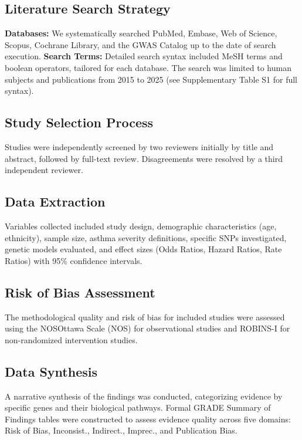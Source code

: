 \documentclass[11pt,a4paper]{article}
\begin{document}
\subsection{Literature Search Strategy}
\textbf{Databases:} We systematically searched PubMed, Embase, Web of Science, Scopus, Cochrane Library, and the GWAS Catalog up to the date of search execution.
\textbf{Search Terms:} Detailed search syntax included MeSH terms and boolean operators, tailored for each database. The search was limited to human subjects and publications from 2015 to 2025 (see Supplementary Table S1 for full syntax).

\subsection{Study Selection Process}
Studies were independently screened by two reviewers initially by title and abstract, followed by full-text review. Disagreements were resolved by a third independent reviewer.

\subsection{Data Extraction}
Variables collected included study design, demographic characteristics (age, ethnicity), sample size, asthma severity definitions, specific SNPs investigated, genetic models evaluated, and effect sizes (Odds Ratios, Hazard Ratios, Rate Ratios) with 95\% confidence intervals.

\subsection{Risk of Bias Assessment}
The methodological quality and risk of bias for included studies were assessed using the NOSOttawa Scale (NOS) for observational studies and ROBINS-I for non-randomized intervention studies.

\subsection{Data Synthesis}
A narrative synthesis of the findings was conducted, categorizing evidence by specific genes and their biological pathways. Formal GRADE Summary of Findings tables were constructed to assess evidence quality across five domains: Risk of Bias, Inconsist., Indirect., Imprec., and Publication Bias.
\end{document}
